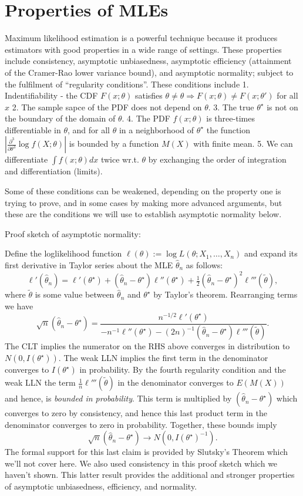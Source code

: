 \documentclass[]{book}
\begin{document}
\section{Properties of MLEs}\label{properties-of-mles}

Maximum likelihood estimation is a powerful technique because it
produces estimators with good properties in a wide range of settings.
These properties include consistency, asymptotic unbiasedness,
asymptotic efficiency (attainment of the Cramer-Rao lower variance
bound), and asymptotic normality; subject to the fulfilment of
``regularity conditions''. These conditions include 1. Indentifiability
- the CDF \(F(x; \theta)\) satisfies
\(\theta\ne\theta\Rightarrow F(x;\theta)\ne F(x;\theta')\) for all \(x\)
2. The sample sapce of the PDF does not depend on \(\theta\). 3. The
true \(\theta^\star\) is not on the boundary of the domain of
\(\theta\). 4. The PDF \(f(x;\theta)\) is three-times differentiable in
\(\theta\), and for all \(\theta\) in a neighborhood of \(\theta^\star\)
the function \(|\frac{\partial^3}{\partial\theta^3}\log f(X;\theta)|\)
is bounded by a function \(M(X)\) with finite mean. 5. We can
differentiate \(\int f(x;\theta)dx\) twice wr.t. \(\theta\) by
exchanging the order of integration and differentiation (limits).

Some of these conditions can be weakened, depending on the property one
is trying to prove, and in some cases by making more advanced arguments,
but these are the conditions we will use to establish asymptotic
normality below.

Proof sketch of asymptotic normality:

Define the loglikelihood function
\(\ell(\theta):=\log L(\theta;X_1, \ldots, X_n)\) and expand its first
derivative in Taylor series about the MLE \(\hat\theta_n\) as follows:
\[\ell'(\hat\theta_n) = \ell'(\theta^\star) + (\hat\theta_n - \theta^\star)\ell''(\theta^\star) + \tfrac12(\hat\theta_n - \theta^\star)^2\ell'''(\tilde\theta),\]
where \(\tilde\theta\) is some value between \(\hat\theta_n\) and
\(\theta^\star\) by Taylor's theorem. Rearranging terms we have
\[\sqrt{n}(\hat\theta_n - \theta^\star) = \frac{n^{-1/2}\ell'(\theta^\star)}{-n^{-1}\ell''(\theta^\star) - (2n)^{-1}(\hat\theta_n-\theta^\star)\ell'''(\tilde\theta)}.\]
The CLT implies the numerator on the RHS above converges in distribution
to \(N(0, I(\theta^\star))\). The weak LLN implies the first term in the
denominator converges to \(I(\theta^\star)\) in probability. By the
fourth regularity condition and the weak LLN the term
\(\tfrac1n \ell'''(\tilde\theta)\) in the denominator converges to
\(E(M(X))\) and hence, is \emph{bounded in probability}. This term is
multiplied by \((\hat\theta_n - \theta^\star)\) which converges to zero
by consistency, and hence this last product term in the denominator
converges to zero in probability. Together, these bounds imply
\[\sqrt{n}(\hat\theta_n - \theta^\star)\rightarrow N(0,I(\theta^\star)^{-1}).\]
The formal support for this last claim is provided by Slutsky's Theorem
which we'll not cover here. We also used consistency in this proof
sketch which we haven't shown. This latter result provides the
additional and stronger properties of asymptotic unbiasedness,
efficiency, and normality.
\end{document}
